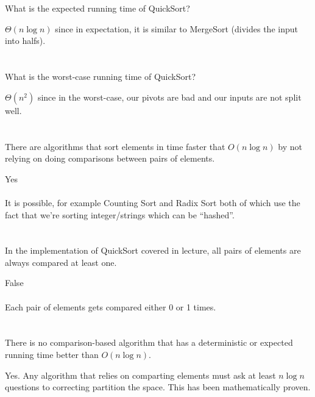 \documentclass [12pt]{article}
\begin{document}
\section{} What is the expected running time of QuickSort?

\begin{Solution}
$\Theta(n \log n)$ since in expectation, it is similar to MergeSort (divides the input into halfs).
\end{Solution}


\section{} What is the worst-case running time of QuickSort?
\begin{Solution}
$\Theta(n^2)$ since in the worst-case, our pivots are bad and our inputs are not split well.
\end{Solution}


\section{} There are algorithms that sort elements in time faster that $O(n \log n)$ by not relying on doing comparisons between pairs of elements.

\begin{Solution}
Yes
\paragraph{} 
It is possible, for example Counting Sort and Radix Sort both of which use the fact that we're sorting integer/strings which can be ``hashed''.
\end{Solution}


\section{} In the implementation of QuickSort covered in lecture, all pairs of elements are always compared at least one.

\begin{Solution}
False
\paragraph{} 
Each pair of elements gets compared either 0 or 1 times.
\end{Solution}


\section{} There is no comparison-based algorithm that has a deterministic or expected running time better than $O(n \log n).$

\begin{Solution}
Yes. Any algorithm that relies on comparting elements must ask at least $n \log n$ questions to correcting partition the space. This has been mathematically proven.
\end{Solution}
\end{document}
